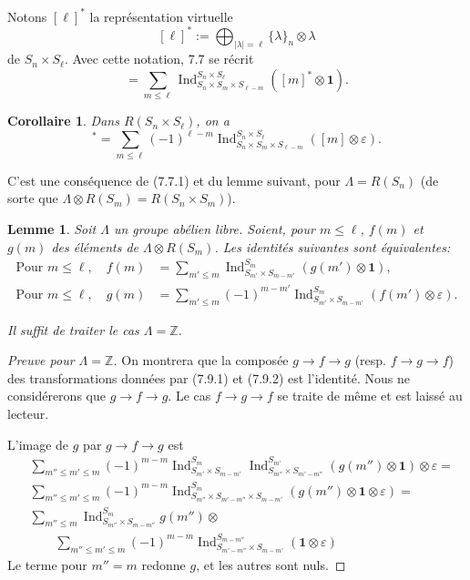\documentclass[11pt,a4paper]{article}
\theoremstyle{plain}
\newtheorem{lemma}[theorem]{Lemme}
\newtheorem{corollary}[theorem]{Corollaire}
\theoremstyle{definition}
\DeclareMathOperator{\Ind}{Ind}
\newcommand{\Z}{\mathbb{Z}}
\newcommand{\eps}{\varepsilon}
\begin{document}
Notons $[\ell]^*$ la repr\'esentation virtuelle
\[
[\ell]^* := \bigoplus_{|\lambda| = \ell} \{\lambda\}_n \otimes \lambda
\]
de $S_n \times S_\ell$. Avec cette notation, 7.7 se r\'ecrit
\begin{equation}
[\ell] = \sum_{m \leq \ell} \Ind_{S_n \times S_m \times S_{\ell-m}}^{S_n \times S_\ell}([m]^* \otimes \mathbf{1}). \tag{7.7.1}
\end{equation}

\begin{corollary}
Dans $R(S_n \times S_\ell)$, on a
\begin{equation}
[\ell]^* = \sum_{m \leq \ell} (-1)^{\ell-m} \Ind_{S_n \times S_m \times S_{\ell-m}}^{S_n \times S_\ell}([m] \otimes \eps). \tag{7.8.1}
\end{equation}
\end{corollary}

C'est une cons\'equence de (7.7.1) et du lemme suivant, pour $\Lambda = R(S_n)$ (de sorte que $\Lambda \otimes R(S_m) = R(S_n \times S_m)$).

\begin{lemma}
Soit $\Lambda$ un groupe ab\'elien libre. Soient, pour $m \leq \ell$, $f(m)$ et $g(m)$ des \'el\'ements de $\Lambda \otimes R(S_m)$. Les identit\'es suivantes sont \'equivalentes:
\begin{align}
\text{Pour } m \leq \ell, \quad f(m) &= \sum_{m' \leq m} \Ind_{S_{m'} \times S_{m-m'}}^{S_m}(g(m') \otimes \mathbf{1}), \tag{7.9.1} \\
\text{Pour } m \leq \ell, \quad g(m) &= \sum_{m' \leq m} (-1)^{m-m'} \Ind_{S_{m'} \times S_{m-m'}}^{S_m}(f(m') \otimes \eps). \tag{7.9.2}
\end{align}

Il suffit de traiter le cas $\Lambda = \Z$.
\end{lemma}

\begin{proof}[Preuve pour $\Lambda = \Z$]
On montrera que la compos\'ee $g \to f \to g$ (resp. $f \to g \to f$) des transformations donn\'ees par (7.9.1) et (7.9.2) est l'identit\'e. Nous ne consid\'ererons que $g \to f \to g$. Le cas $f \to g \to f$ se traite de m\^eme et est laiss\'e au lecteur.

L'image de $g$ par $g \to f \to g$ est
\begin{align*}
&\sum_{m'' \leq m' \leq m} (-1)^{m-m} \Ind_{S_{m'} \times S_{m-m'}}^{S_m} \Ind_{S_{m''} \times S_{m'-m''}}^{S_{m'}}(g(m'') \otimes \mathbf{1}) \otimes \eps = \\
&\sum_{m'' \leq m' \leq m} (-1)^{m-m} \Ind_{S_{m''} \times S_{m'-m''} \times S_{m-m'}}^{S_m}(g(m'') \otimes \mathbf{1} \otimes \eps) = \\
&\sum_{m'' \leq m} \Ind_{S_{m''} \times S_{m-m''}}^{S_m} g(m'') \otimes \\
&\qquad \sum_{m'' \leq m' \leq m} (-1)^{m-m} \Ind_{S_{m'-m''} \times S_{m-m'}}^{S_{m-m''}}(\mathbf{1} \otimes \eps)
\end{align*}
Le terme pour $m'' = m$ redonne $g$, et les autres sont nuls.
\end{proof}
\end{document}
